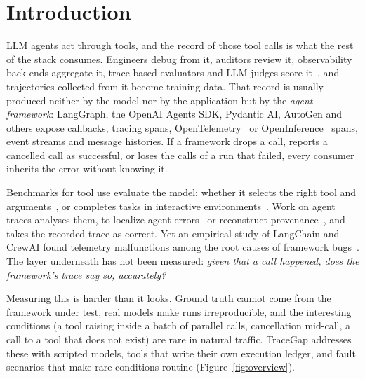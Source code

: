 \documentclass[10pt]{article}
\begin{document}
\section{Introduction}
\label{sec:intro}

LLM agents act through tools, and the record of those tool calls is what the rest of the stack consumes. Engineers debug from it, auditors review it, observability back ends aggregate it, trace-based evaluators and LLM judges score it~\citep{deshpande2025trail,zhang2025whowhen}, and trajectories collected from it become training data. That record is usually produced neither by the model nor by the application but by the \emph{agent framework}: LangGraph, the OpenAI Agents SDK, Pydantic AI, AutoGen and others expose callbacks, tracing spans, OpenTelemetry~\citep{otel2026genai} or OpenInference~\citep{openinference2026} spans, event streams and message histories. If a framework drops a call, reports a cancelled call as successful, or loses the calls of a run that failed, every consumer inherits the error without knowing it.

Benchmarks for tool use evaluate the model: whether it selects the right tool and arguments~\citep{patil2023gorilla,qin2024toolllm}, or completes tasks in interactive environments~\citep{yao2024tau,liu2024agentbench}. Work on agent traces analyses them, to localize agent errors~\citep{deshpande2025trail,cemri2025mast} or reconstruct provenance~\citep{wang2026survey}, and takes the recorded trace as correct. Yet an empirical study of LangChain and CrewAI found telemetry malfunctions among the root causes of framework bugs~\citep{zhu2026bugs}. The layer underneath has not been measured: \emph{given that a call happened, does the framework's trace say so, accurately?}

Measuring this is harder than it looks. Ground truth cannot come from the framework under test, real models make runs irreproducible, and the interesting conditions (a tool raising inside a batch of parallel calls, cancellation mid-call, a call to a tool that does not exist) are rare in natural traffic. TraceGap addresses these with scripted models, tools that write their own execution ledger, and fault scenarios that make rare conditions routine (Figure~\ref{fig:overview}).
\end{document}
